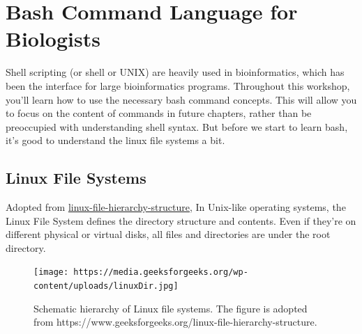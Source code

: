 \documentclass[
  letterpaper,
  DIV=11,
  numbers=noendperiod]{scrreprt}
\begin{document}

\hypertarget{bash-command-language-for-biologists}{%
\chapter{Bash Command Language for
Biologists}\label{bash-command-language-for-biologists}}

Shell scripting (or shell or UNIX) are heavily used in bioinformatics,
which has been the interface for large bioinformatics programs.
Throughout this workshop, you'll learn how to use the necessary bash
command concepts. This will allow you to focus on the content of
commands in future chapters, rather than be preoccupied with
understanding shell syntax. But before we start to learn bash, it's good
to understand the linux file systems a bit.

\hypertarget{linux-file-systems}{%
\section{Linux File Systems}\label{linux-file-systems}}

Adopted from
\href{https://www.geeksforgeeks.org/linux-file-hierarchy-structure}{linux-file-hierarchy-structure},
In Unix-like operating systems, the Linux File System defines the
directory structure and contents. Even if they're on different physical
or virtual disks, all files and directories are under the root
directory.

\begin{figure}

{\centering \texttt{[image: https://media.geeksforgeeks.org/wp-content/uploads/linuxDir.jpg]}

}

\caption{Schematic hierarchy of Linux file systems. The figure is
adopted from
https://www.geeksforgeeks.org/linux-file-hierarchy-structure.}

\end{figure}
\end{document}
